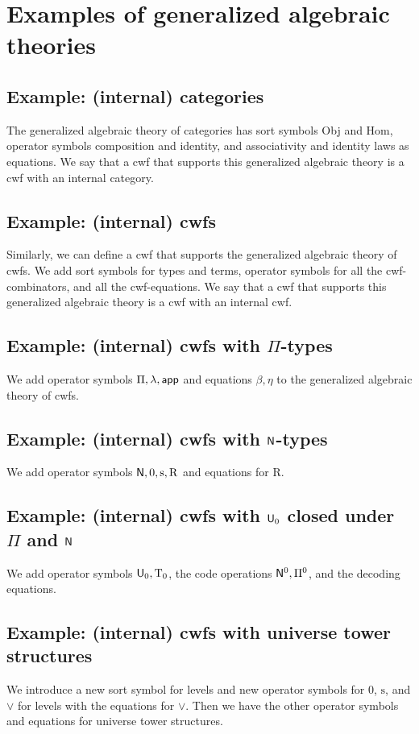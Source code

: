\documentclass{lmcs}
\newcommand{\s}{\mathrm{s}}
\newcommand{\Rec}{\mathrm{R}}
\newcommand{\Ta}{\mathrm{T}}
\begin{document}
\section{Examples of generalized algebraic theories}

\subsection{Example: (internal) categories} The generalized algebraic theory of categories has sort symbols Obj and Hom, operator symbols composition and identity, and associativity and identity laws as equations. We say that a cwf that supports this generalized algebraic theory is a cwf with an internal category.

\subsection{Example: (internal) cwfs} Similarly, we can define a cwf that supports the generalized algebraic theory of cwfs. We add sort symbols for types and terms, operator symbols for all the cwf-combinators, and all the cwf-equations. We say that a cwf that supports this generalized algebraic theory is a cwf with an internal cwf.

\subsection{Example: (internal) cwfs with $\Pi$-types} 
We add operator symbols $\Pi, \lambda, \mathsf{app}$ and equations $\beta, \eta$ to the generalized algebraic theory of cwfs. 

\subsection{Example: (internal) cwfs with $\mathsf{N}$-types} 
We add operator symbols $\N, 0, \s, \Rec$ and equations for $\Rec$.

\subsection{Example: (internal) cwfs with $\mathsf{U}_0$ closed under $\Pi$ and $\mathsf{N}$} 
We add operator symbols $\U_0, \Ta_0$, the code operations $\mathsf{N}^0, \Pi^0$, and the decoding equations.

\subsection{Example: (internal) cwfs with universe tower structures} We introduce a new sort symbol for levels and new operator symbols for 0, $\s$, and $\vee$ for levels with the equations for $\vee$. Then we have the other operator symbols and equations for universe tower structures.
\end{document}
